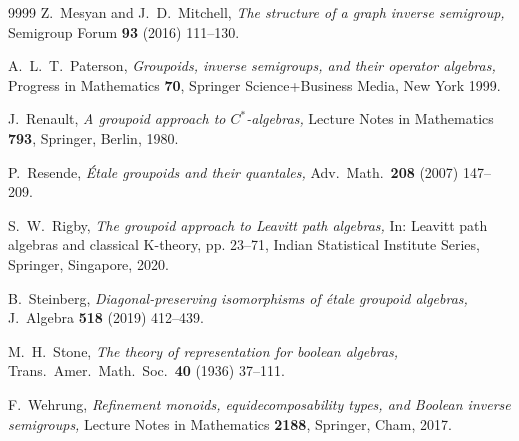 \documentclass[a4paper,reqno,12pt]{amsart}
\numberwithin{equation}{section}
\theoremstyle{plain}
\theoremstyle{definition}
\begin{document}
\begin{thebibliography}{9999}
 Z.\ Mesyan and J.\ D.\ Mitchell, \textit{The structure of a graph inverse semigroup,} Semigroup Forum \textbf{93} (2016) 111--130.

 A.\ L.\ T.\ Paterson, \textit{Groupoids, inverse semigroups, and their operator algebras,} Progress in Mathematics \textbf{70}, Springer Science+Business Media, New York 1999.

 J.\ Renault, \textit{A groupoid approach to $C^*$-algebras,} Lecture Notes in Mathematics \textbf{793}, Springer, Berlin, 1980.

 P.\ Resende, \textit{Étale groupoids and their quantales,} Adv.\ Math.\ \textbf{208} (2007) 147--209.

 S.\ W.\ Rigby, \textit{The groupoid approach to Leavitt path algebras,} In: Leavitt path algebras and classical K-theory, pp. 23--71, Indian Statistical Institute Series, Springer, Singapore, 2020.

 B.\ Steinberg, \textit{Diagonal-preserving isomorphisms of étale groupoid algebras,} J.\ Algebra \textbf{518} (2019) 412--439.

 M.\ H.\ Stone, \textit{The theory of representation for boolean algebras,} Trans.\ Amer.\ Math.\ Soc.\ \textbf{40} (1936) 37--111.

 F.\ Wehrung, \textit{Refinement monoids, equidecomposability types, and Boolean inverse semigroups,} Lecture Notes in Mathematics \textbf{2188}, Springer, Cham, 2017. 

\end{thebibliography}
\end{document}

